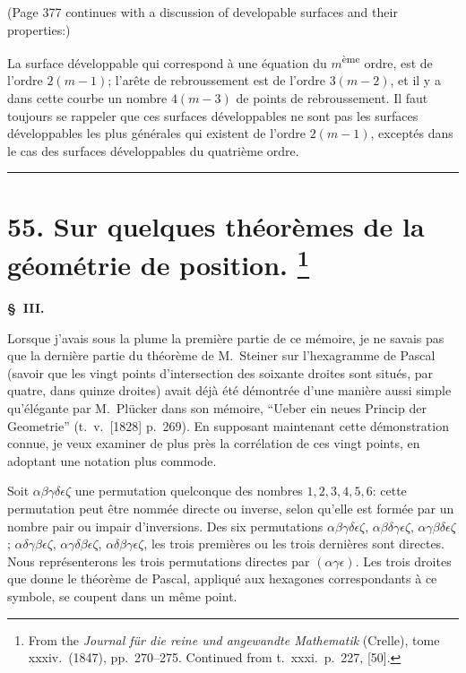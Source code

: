 \documentclass[11pt,a4paper]{book}
\begin{document}
(Page 377 continues with a discussion of developable surfaces and their properties:)

La surface d\'{e}veloppable qui correspond \`{a} une \'{e}quation du $m$\textsuperscript{\`{e}me} ordre,
est de l'ordre $2(m-1)$; l'ar\^{e}te de rebroussement est de l'ordre $3(m-2)$,
et il y a dans cette courbe un nombre $4(m-3)$ de points de rebroussement.
Il faut toujours se rappeler que ces surfaces d\'{e}veloppables ne sont pas les
surfaces d\'{e}veloppables les plus g\'{e}n\'{e}rales qui existent de l'ordre $2(m-1)$,
except\'{e}s dans le cas des surfaces d\'{e}veloppables du quatri\`{e}me ordre.

\bigskip
\hrule
\bigskip


\newpage
\section[Sur quelques th\'{e}or\`{e}mes de la g\'{e}om\'{e}trie de position]{%
55. Sur quelques th\'{e}or\`{e}mes de la g\'{e}om\'{e}trie de position.%
\footnote{From the \textit{Journal f\"{u}r die reine und angewandte Mathematik} (Crelle), tome xxxiv.\ (1847), pp.~270--275. Continued from t.~xxxi.\ p.~227, [50].}}

\textbf{\S~III.}

Lorsque j'avais sous la plume la premi\`{e}re partie de ce m\'{e}moire, je ne savais
pas que la derni\`{e}re partie du th\'{e}or\`{e}me de M.~Steiner sur l'hexagramme de Pascal
(savoir que les vingt points d'intersection des soixante droites sont situ\'{e}s, par quatre,
dans quinze droites) avait d\'{e}j\`{a} \'{e}t\'{e} d\'{e}montr\'{e}e d'une mani\`{e}re aussi simple qu'\'{e}l\'{e}gante
par M.~Pl\"{u}cker dans son m\'{e}moire, ``Ueber ein neues Princip der Geometrie''
(t.~v.\ [1828] p.~269). En supposant maintenant cette d\'{e}monstration connue,
je veux examiner de plus pr\`{e}s la corr\'{e}lation de ces vingt points, en adoptant
une notation plus commode.

Soit $\alpha\beta\gamma\delta\epsilon\zeta$ une permutation quelconque des nombres $1, 2, 3, 4, 5, 6$:
cette permutation peut \^{e}tre nomm\'{e}e directe ou inverse, selon qu'elle est form\'{e}e
par un nombre pair ou impair d'inversions. Des six permutations
$\alpha\beta\gamma\delta\epsilon\zeta$,
$\alpha\beta\delta\gamma\epsilon\zeta$,
$\alpha\gamma\beta\delta\epsilon\zeta$;
$\alpha\delta\gamma\beta\epsilon\zeta$,
$\alpha\gamma\delta\beta\epsilon\zeta$,
$\alpha\delta\beta\gamma\epsilon\zeta$,
les trois premi\`{e}res ou les trois derni\`{e}res sont directes.
Nous repr\'{e}senterons les trois permutations directes par $(\alpha\gamma\epsilon)$.
Les trois droites que donne le th\'{e}or\`{e}me de Pascal, appliqu\'{e} aux hexagones
correspondants \`{a} ce symbole, se coupent dans un m\^{e}me point.
\end{document}
